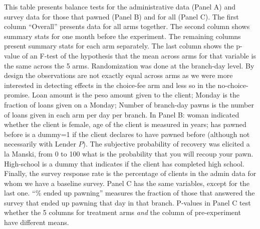 \documentclass[oneside,11pt]{article}
\begin{document}
\scriptsize {
\noindent This table presents balance tests for the administrative data (Panel A) and survey data for those that pawned (Panel B) and for all (Panel C). The first column ``Overall'' presents data for all arms together. The second column shows summary stats for one month before the experiment. The remaining columns present summary stats  for each arm separately. The last column shows the p-value of an F-test of the hypothesis that the mean across arms for that variable is the same across the 5 arms. Randomization was done at the branch-day level. By design the observations are not exactly equal across arms as we were more interested in detecting effects in the choice-fee arm and less so in the no-choice-promise. Loan amount is the peso amount given to the client; Monday is the fraction of loans given on a Monday; Number of branch-day pawns is the number of loans given in each arm per day per branch.  In Panel B: woman indicated whether the client is female, age of the client is measured in years; has pawned before is a dummy=1 if the client declares to have pawned before (although not necessarily with Lender $P$). The subjective probability of recovery was elicited a la Manski, from 0 to 100 what is the probability that you will recoup your pawn. High-school is a dummy that indicates if the client has completed high school. Finally, the survey response rate is the percentage of clients in the admin data for whom we have a baseline survey. Panel C has the same variables, except for the last one. ``\% ended up pawning'' measures the fraction of those that answered the survey that ended up pawning that day in that branch.  P-values in Panel C test whether the 5 columns for treatment arms \textit{and} the column of pre-experiment have different means.
}

\vspace{3ex}





\scriptsize {
\noindent 
}
\end{document}
